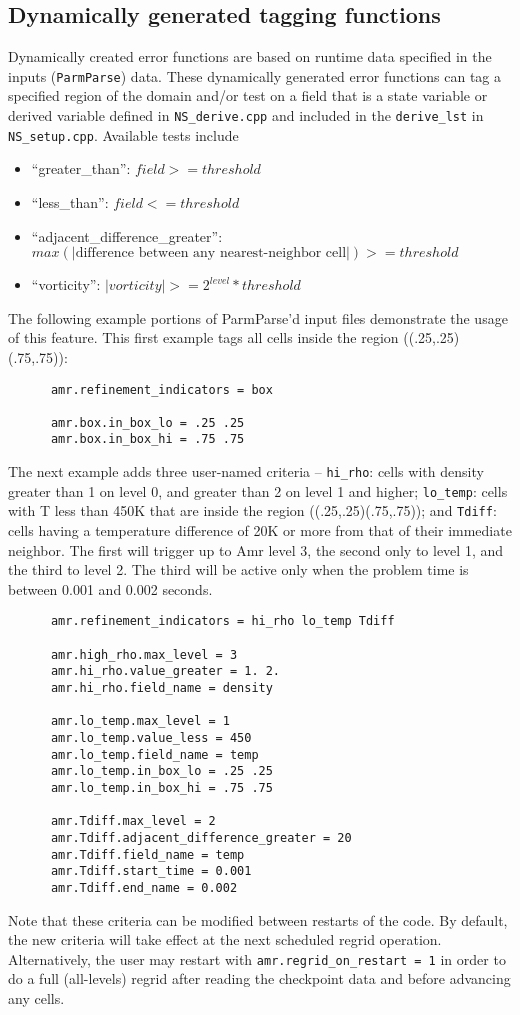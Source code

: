 \subsection{Dynamically generated tagging functions}
Dynamically created error functions are based on runtime data specified in the
inputs ({\tt ParmParse}) data.
These dynamically generated error functions can tag a specified region of the domain and/or test on a field
that is a state variable
or derived variable defined in {\tt NS\_derive.cpp} and included in the {\tt derive\_lst} in {\tt NS\_setup.cpp}.
Available tests include
\begin{itemize}
\item ``greater\_than'': $field >= threshold$
\item ``less\_than'': $field <= threshold$
\item ``adjacent\_difference\_greater'': $max( | \text{difference between any nearest-neighbor cell} | ) >= threshold$
\item ``vorticity'': $ |vorticity| >= 2^{level} * threshold$
\end{itemize}

The following example portions of ParmParse'd input files demonstrate the usage of this feature.
This first example tags all cells inside the region ((.25,.25)(.75,.75)):
\begin{verbatim}
      amr.refinement_indicators = box

      amr.box.in_box_lo = .25 .25
      amr.box.in_box_hi = .75 .75
\end{verbatim}
The next example adds three user-named criteria -- 
{\tt hi\_rho}: cells with density greater than 1 on level 0, and greater than 2 on
level 1 and higher;
{\tt lo\_temp}: cells with T less than 450K that are inside the region ((.25,.25)(.75,.75));
and {\tt Tdiff}: cells having a temperature difference of 20K
or more from that of their
immediate neighbor.  The first will trigger up to Amr level 3, the second only to level 1, and the third to level 2.
The third will be active only when the problem time is between 0.001 and 0.002 seconds.
\begin{verbatim}
      amr.refinement_indicators = hi_rho lo_temp Tdiff

      amr.high_rho.max_level = 3
      amr.hi_rho.value_greater = 1. 2.
      amr.hi_rho.field_name = density

      amr.lo_temp.max_level = 1
      amr.lo_temp.value_less = 450
      amr.lo_temp.field_name = temp
      amr.lo_temp.in_box_lo = .25 .25
      amr.lo_temp.in_box_hi = .75 .75

      amr.Tdiff.max_level = 2
      amr.Tdiff.adjacent_difference_greater = 20
      amr.Tdiff.field_name = temp
      amr.Tdiff.start_time = 0.001
      amr.Tdiff.end_name = 0.002
\end{verbatim}
Note that these criteria can be modified between restarts of the code.
By default, the new criteria will take effect at the next
scheduled regrid operation.  Alternatively, the user may restart with {\tt amr.regrid\_on\_restart = 1} in order to
do a full (all-levels) regrid after reading the checkpoint data and before advancing any cells.



